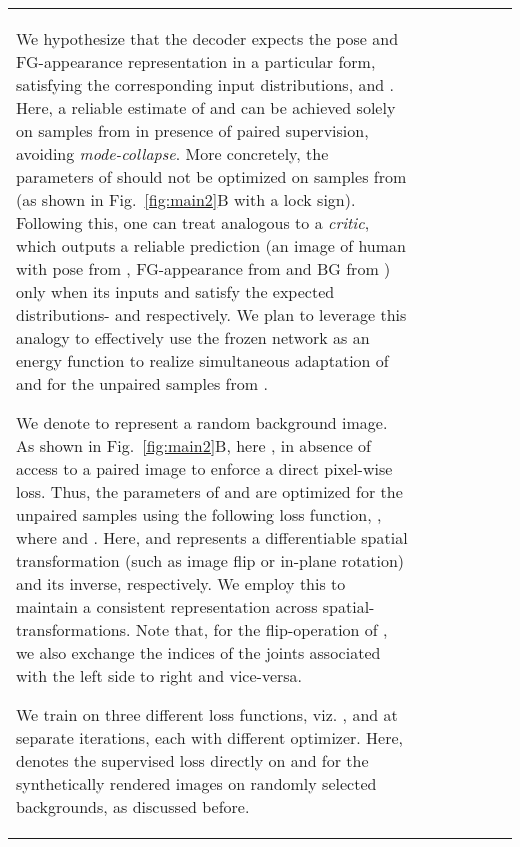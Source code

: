 \documentclass[letterpaper]{article} \usepackage{aaai20}  \usepackage{times}  \usepackage{helvet}  \usepackage{courier}  \usepackage{url}  \usepackage{graphicx}  \usepackage{amsmath}
\begin{document}
\begin{table}[t]
{\begin{tabular}{l|ccc|cc|c}
{{We hypothesize that the decoder  expects the pose and FG-appearance representation in a particular form, satisfying the corresponding input distributions,  and . Here, a reliable estimate of  and  can be achieved solely on samples from  in presence of paired supervision, avoiding \textit{mode-collapse}. More concretely, the parameters of  should not be optimized on samples from  (as shown in Fig.~\ref{fig:main2}B with a lock sign). Following this, one can treat  analogous to a \textit{critic}, which outputs a reliable prediction (an image of human with pose from , FG-appearance from  and BG from ) only when its inputs  and  satisfy the expected distributions-  and  respectively. We plan to leverage this analogy to effectively use the frozen  network as an energy function to realize simultaneous adaptation of  and  for the unpaired samples from .

We denote  to represent a random background image. As shown in Fig.~\ref{fig:main2}B, here , in absence of access to a paired image to enforce a direct pixel-wise loss. Thus, the parameters of  and  are optimized for the unpaired samples using the following loss function, 
, where  and . Here,  and  represents a differentiable spatial transformation (such as image flip or in-plane rotation) and its inverse, respectively. We employ this to maintain a consistent representation across spatial-transformations. Note that, for the flip-operation of , we also exchange the indices of the joints associated with the left side to right and vice-versa.

We train on three different loss functions, viz. , and  at separate iterations, each with different optimizer. Here,  denotes the supervised loss directly on  and  for the synthetically rendered images on randomly selected backgrounds, as discussed before.


}}
\end{tabular}}
\end{table}
\end{document}
